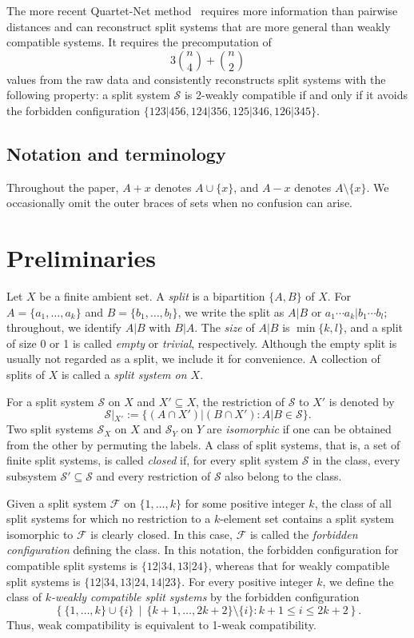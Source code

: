\documentclass[11pt]{article}
\newcommand{\cS}{\mathcal{S}}
\begin{document}
	The more recent Quartet-Net method~\cite{YangGrunewaldWan2013} requires more information than pairwise distances and can reconstruct split systems that are more general than weakly compatible systems. It requires the precomputation of
	\[
	3\binom{n}{4}+\binom{n}{2}
	\]
	values from the raw data and consistently reconstructs split systems with the following property: a split system $\cS$ is 2-weakly compatible if and only if it avoids the forbidden configuration $\{123|456,124|356,125|346,126|345\}$.
	
	\subsection{Notation and terminology}
	
	Throughout the paper, $A+x$ denotes $A\cup\{x\}$, and $A-x$ denotes $A\setminus\{x\}$. We occasionally omit the outer braces of sets when no confusion can arise.
	
	\section{Preliminaries}
	
	Let $X$ be a finite ambient set. A \emph{split} is a bipartition $\{A,B\}$ of $X$. For $A=\{a_1,\ldots,a_k\}$ and $B=\{b_1,\ldots,b_l\}$, we write the split as $A|B$ or $a_1\cdots a_k|b_1\cdots b_l$; throughout, we identify $A|B$ with $B|A$. The \emph{size} of $A|B$ is $\min\{k,l\}$, and a split of size 0 or 1 is called \emph{empty} or \emph{trivial}, respectively. Although the empty split is usually not regarded as a split, we include it for convenience. A collection of splits of $X$ is called a \emph{split system on $X$}.
	
	For a split system $\cS$ on $X$ and $X'\subseteq X$, the restriction of $\cS$ to $X'$ is denoted by
	\[
	\cS|_{X'}:=\{(A\cap X')|(B\cap X'):A|B\in\cS\}.
	\]
	Two split systems $\cS_X$ on $X$ and $\cS_Y$ on $Y$ are \emph{isomorphic} if one can be obtained from the other by permuting the labels. A class of split systems, that is, a set of finite split systems, is called \emph{closed} if, for every split system $\cS$ in the class, every subsystem $\cS'\subseteq\cS$ and every restriction of $\cS$ also belong to the class.
	
	Given a split system $\mathcal{F}$ on $\{1,\ldots,k\}$ for some positive integer $k$, the class of all split systems for which no restriction to a $k$-element set contains a split system isomorphic to $\mathcal{F}$ is clearly closed. In this case, $\mathcal{F}$ is called the \emph{forbidden configuration} defining the class. In this notation, the forbidden configuration for compatible split systems is $\{12|34,13|24\}$, whereas that for weakly compatible split systems is $\{12|34,13|24,14|23\}$. For every positive integer $k$, we define the class of \emph{$k$-weakly compatible split systems} by the forbidden configuration
	\[
	\left\{\{1,\ldots,k\}\cup\{i\}\,\middle|\,\{k+1,\ldots,2k+2\}\setminus\{i\}: k+1\le i\le 2k+2\right\}.
	\]
	Thus, weak compatibility is equivalent to 1-weak compatibility.
	
\end{document}
